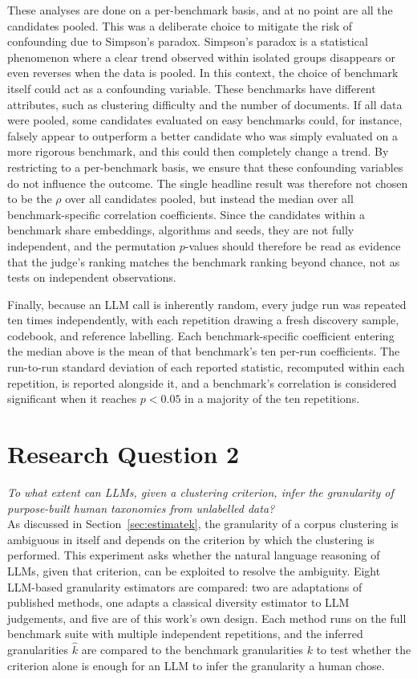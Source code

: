 \documentclass[11pt,a4paper,oneside]{report}
\begin{document}
These analyses are done on a per-benchmark basis, and at no point are all the candidates pooled. This was a deliberate choice to mitigate the risk of confounding due to Simpson's paradox. Simpson's paradox is a statistical phenomenon where a clear trend observed within isolated groups disappears or even reverses when the data is pooled. In this context, the choice of benchmark itself could act as a confounding variable. These benchmarks have different attributes, such as clustering difficulty and the number of documents. If all data were pooled, some candidates evaluated on easy benchmarks could, for instance, falsely appear to outperform a better candidate who was simply evaluated on a more rigorous benchmark, and this could then completely change a trend. By restricting to a per-benchmark basis, we ensure that these confounding variables do not influence the outcome. The single headline result was therefore not chosen to be the $\rho$ over all candidates pooled, but instead the median over all benchmark-specific correlation coefficients. Since the candidates within a benchmark share embeddings, algorithms and seeds, they are not fully independent, and the permutation $p$-values should therefore be read as evidence that the judge's ranking matches the benchmark ranking beyond chance, not as tests on independent observations.

Finally, because an LLM call is inherently random, every judge run was repeated ten times independently, with each repetition drawing a fresh discovery sample, codebook, and reference labelling. Each benchmark-specific coefficient entering the median above is the mean of that benchmark's ten per-run coefficients. The run-to-run standard deviation of each reported statistic, recomputed within each repetition, is reported alongside it, and a benchmark's correlation is considered significant when it reaches $p < 0.05$ in a majority of the ten repetitions.

\section{Research Question 2}

\emph{To what extent can LLMs, given a clustering criterion, infer the granularity of purpose-built human taxonomies from unlabelled data?}\\

As discussed in Section~\ref{sec:estimatek}, the granularity of a corpus clustering is ambiguous in itself and depends on the criterion by which the clustering is performed. This experiment asks whether the natural language reasoning of LLMs, given that criterion, can be exploited to resolve the ambiguity. Eight LLM-based granularity estimators are compared: two are adaptations of published methods, one adapts a classical diversity estimator to LLM judgements, and five are of this work's own design. Each method runs on the full benchmark suite with multiple independent repetitions, and the inferred granularities $\hat{k}$ are compared to the benchmark granularities $k$ to test whether the criterion alone is enough for an LLM to infer the granularity a human chose.
\end{document}
